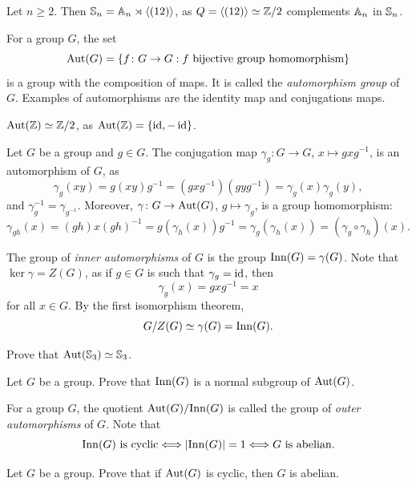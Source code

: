 \begin{example}
    Let $n\geq2$. Then 
$\mathbb{S}_n=\mathbb{A}_n\rtimes\langle(12)\rangle$, as $Q=\langle (12)\rangle\simeq\mathbb{Z}/2$ complements 
$\mathbb{A}_n$ in $\mathbb{S}_n$.
\end{example}

For a group $G$, 
the set 
\[
\operatorname{Aut}(G)=\{f\colon G\to G:f\text{ bijective group homomorphism}\}
\]
is a group with the composition of maps. It is called 
the \emph{automorphism group} of $G$. 
Examples of automorphisms are the identity map and 
conjugations maps. 

\begin{example}
$\operatorname{Aut}(\mathbb{Z})\simeq\mathbb{Z}/2$, as $\operatorname{Aut}(\mathbb{Z})=\{\operatorname{id},-\operatorname{id}\}$.
\end{example}

\begin{example}
Let $G$ be a group and $g\in G$. The conjugation 
map $\gamma_g\colon G\to G$, $x\mapsto gxg^{-1}$,
is an automorphism of $G$, as 
\[
\gamma_g(xy)=g(xy)g^{-1}=(gxg^{-1})(gyg^{-1})=\gamma_g(x)\gamma_g(y),
\]
and $\gamma_g^{-1}=\gamma_{g^{-1}}$. Moreover, 
$\gamma\colon G\to\operatorname{Aut}(G)$, $g\mapsto\gamma_g$, is a group
homomorphism:
\[
\gamma_{gh}(x)=(gh)x(gh)^{-1}=g(\gamma_h(x))g^{-1}=\gamma_g(\gamma_h(x))=(\gamma_g\circ\gamma_h)(x).
\]

The group of \emph{inner automorphisms} of $G$ is the 
group 
$\mathrm{Inn}(G)=\gamma(G)$. Note that $\ker\gamma=Z(G)$, as
if $g\in G$ is such that $\gamma_g=\operatorname{id}$, then 
\[
\gamma_g(x)=gxg^{-1}=x
\]
for all $x\in G$. By the first isomorphism theorem, 
\[
G/Z(G)\simeq \gamma(G)=\mathrm{Inn}(G).
\]
\end{example}

\begin{exercise}
\label{xca:aut(S3)}
    Prove that $\operatorname{Aut}(\mathbb{S}_3)\simeq\mathbb{S}_3$. 
\end{exercise}

\begin{exercise}
\label{xca:inner_is_normal}
    Let $G$ be a group. Prove that $\mathrm{Inn}(G)$ is a normal subgroup of $\operatorname{Aut}(G)$. 
\end{exercise} 

For a group $G$, the quotient $\operatorname{Aut}(G)/\mathrm{Inn}(G)$ is called 
the group of \emph{outer automorphisms} of $G$. 
Note that 
\[
\mathrm{Inn}(G)\text{ is cyclic}\Longleftrightarrow
|\mathrm{Inn}(G)|=1\Longleftrightarrow
G\text{ is abelian.}
\]

\begin{exercise}
\label{xca:aut_cyclic}
Let $G$ be a group. 
Prove that if $\operatorname{Aut}(G)$ is cyclic, then 
$G$ is abelian. 
\end{exercise}

